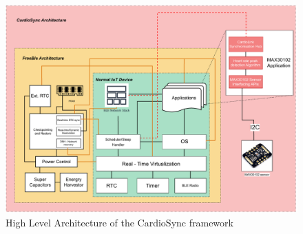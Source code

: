 \begin{figure}[H]
    \centering
    \includegraphics[width=\linewidth]{chapters/Architecture/architecture.pdf}
    \caption{High Level Architecture of the CardioSync framework}
    \label{fig:architecture}
\end{figure}

